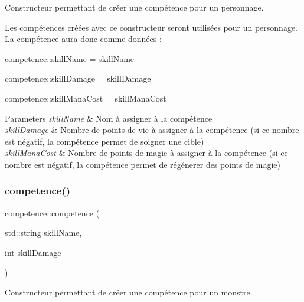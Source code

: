 Constructeur permettant de créer une compétence pour un personnage. 

Les compétences créées avec ce constructeur seront utilisées pour un personnage. La compétence aura donc comme données \+:
\begin{DoxyItemize}
\item competence\+::skill\+Name = skill\+Name
\item competence\+::skill\+Damage = skill\+Damage
\item competence\+::skill\+Mana\+Cost = skill\+Mana\+Cost 
\begin{DoxyParams}{Parameters}
{\em skill\+Name} & Nom à assigner à la compétence \\
\hline
{\em skill\+Damage} & Nombre de points de vie à assigner à la compétence (si ce nombre est négatif, la compétence permet de soigner une cible) \\
\hline
{\em skill\+Mana\+Cost} & Nombre de points de magie à assigner à la compétence (si ce nombre est négatif, la compétence permet de régénerer des points de magie) \\
\hline
\end{DoxyParams}

\end{DoxyItemize}\mbox{\label{classcompetence_a269947808c5e8662ecabb11e96a4d9c0}} 
\subsubsection{\texorpdfstring{competence()}{competence()}\hspace{0.1cm}{\footnotesize\ttfamily [3/3]}}
{\footnotesize\ttfamily competence\+::competence (\begin{DoxyParamCaption}\item[{std\+::string}]{skill\+Name,  }\item[{int}]{skill\+Damage }\end{DoxyParamCaption})}



Constructeur permettant de créer une compétence pour un monstre. 

